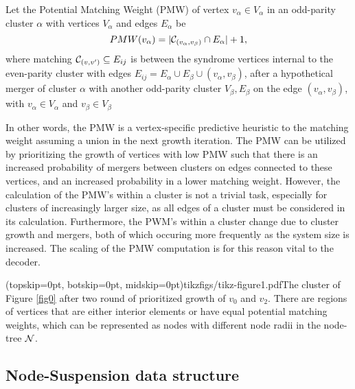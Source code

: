 \begin{definition}\label{def:pmw}
    Let the Potential Matching Weight (PMW) of vertex $v_\alpha \in V_\alpha$ in an odd-parity cluster $\alpha$ with vertices $V_\alpha$ and edges $E_\alpha$ be
    \begin{equation}
      PMW(v_\alpha) = \lvert\mathcal{C}_{(v_\alpha,v_\beta)} \cap E_\alpha\rvert + 1,
    \end{equation}
    where matching $\mathcal{C}_{(v,v')} \subseteq E_{ij}$ is between the syndrome vertices internal to the even-parity cluster with edges $E_{ij} = E_\alpha \cup E_\beta \cup (v_\alpha, v_\beta)$, after a hypothetical merger of cluster $\alpha$ with another odd-parity cluster $V_\beta, E_\beta$ on the edge $(v_\alpha, v_\beta)$, with $v_\alpha\in V_\alpha$ and  $v_\beta \in V_\beta$
\end{definition}

In other words, the PMW is a vertex-specific predictive heuristic to the matching weight assuming a union in the next growth iteration. The PMW can be utilized by prioritizing the growth of vertices with low PMW such that there is an increased probability of mergers between clusters on edges connected to these vertices, and an increased probability in a lower matching weight. However, the calculation of the PMW's within a cluster is not a trivial task, especially for clusters of increasingly larger size, as all edges of a cluster must be considered in its calculation. Furthermore, the PWM's within a cluster change due to cluster growth and mergers, both of which occuring more frequently as the system size is increased. The scaling of the PMW computation is for this reason vital to the decoder. 

\Figure[htb](topskip=0pt, botskip=0pt, midskip=0pt){tikzfigs/tikz-figure1.pdf}{The cluster of Figure \ref{fig0} after two round of prioritized growth of $v_0$ and $v_2$. There are regions of vertices that are either interior elements or have equal potential matching weights, which can be represented as nodes with different node radii in the node-tree $\mathcal{N}$. \label{fig1}}

\subsection{Node-Suspension data structure}\label{sec:nodeset}

